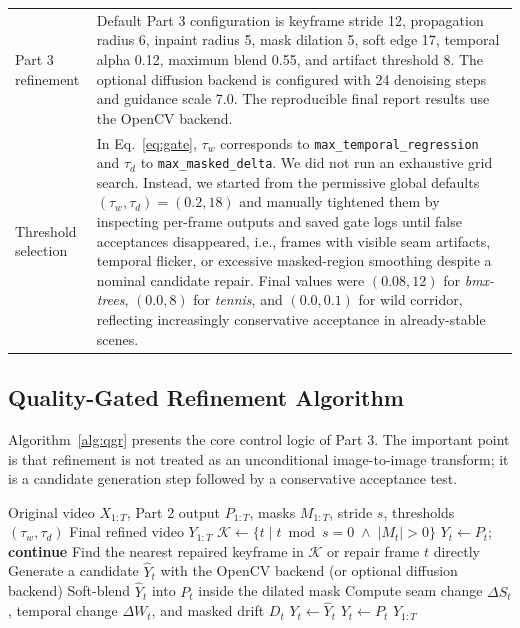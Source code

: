 \documentclass[10pt,twocolumn,letterpaper]{article}
\begin{document}
\begin{table}[t]
\begin{tabular}{lp{}}
Part 3 refinement & Default Part 3 configuration is keyframe stride 12, propagation radius 6, inpaint radius 5, mask dilation 5, soft edge 17, temporal alpha 0.12, maximum blend 0.55, and artifact threshold 8. The optional diffusion backend is configured with 24 denoising steps and guidance scale 7.0. The reproducible final report results use the OpenCV backend. \\
Threshold selection & In Eq.~\ref{eq:gate}, $\tau_w$ corresponds to \texttt{max\_temporal\_regression} and $\tau_d$ to \texttt{max\_masked\_delta}. We did not run an exhaustive grid search. Instead, we started from the permissive global defaults $(\tau_w,\tau_d)=(0.2,18)$ and manually tightened them by inspecting per-frame outputs and saved gate logs until false acceptances disappeared, i.e., frames with visible seam artifacts, temporal flicker, or excessive masked-region smoothing despite a nominal candidate repair. Final values were $(0.08,12)$ for \textit{bmx-trees}, $(0.0,8)$ for \textit{tennis}, and $(0.0,0.1)$ for wild corridor, reflecting increasingly conservative acceptance in already-stable scenes. \\
\bottomrule
\end{tabular}
\end{table}

\subsection{Quality-Gated Refinement Algorithm}
Algorithm~\ref{alg:qgr} presents the core control logic of Part 3. The important point is that refinement is not treated as an unconditional image-to-image transform; it is a candidate generation step followed by a conservative acceptance test.

\begin{algorithm}[t]
\caption{Quality-Gated Refinement}
\label{alg:qgr}
\begin{algorithmic}[1]
\REQUIRE Original video $X_{1:T}$, Part 2 output $P_{1:T}$, masks $M_{1:T}$, stride $s$, thresholds $(\tau_w,\tau_d)$
\ENSURE Final refined video $Y_{1:T}$
\STATE $\mathcal{K} \leftarrow \{t \mid t \bmod s = 0 \;\land\; |M_t| > 0\}$
        \STATE $Y_t \leftarrow P_t$; \textbf{continue}
    \ENDIF
    \STATE Find the nearest repaired keyframe in $\mathcal{K}$ or repair frame $t$ directly
    \STATE Generate a candidate $\hat{Y}_t$ with the OpenCV backend (or optional diffusion backend)
    \STATE Soft-blend $\hat{Y}_t$ into $P_t$ inside the dilated mask
    \STATE Compute seam change $\Delta S_t$, temporal change $\Delta W_t$, and masked drift $D_t$
        \STATE $Y_t \leftarrow \hat{Y}_t$
    \ELSE
        \STATE $Y_t \leftarrow P_t$
    \ENDIF
\ENDFOR
\RETURN $Y_{1:T}$
\end{algorithmic}
\end{algorithm}
\end{document}
